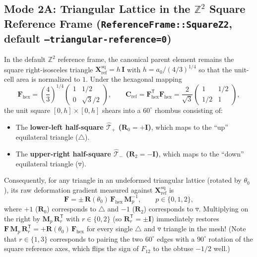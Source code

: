 \documentclass[11pt,a4paper]{article}
\newcommand{\Z}{\mathbb{Z}}
\newcommand{\T}{^{\mathsf T}}
\newcommand{\code}[1]{\texttt{#1}}
\begin{document}
\subsection{Mode 2A: Triangular Lattice in the $\Z^2$ Square Reference Frame (\code{ReferenceFrame::SquareZ2}, default \code{--triangular-reference=0})}
In the default $\Z^2$ reference frame, the canonical parent element remains the square right-isosceles triangle $\mathbf{X}_{\text{ref}}^{\text{sq}} = h\,\mathbf{I}$ with $h = a_0 / (4/3)^{1/4}$ so that the unit-cell area is normalized to $1$. Under the hexagonal mapping
\begin{equation}
  \mathbf{F}_{\text{hex}} = \left(\frac{4}{3}\right)^{1/4}
  \begin{pmatrix}
    1 & 1/2 \\
    0 & \sqrt{3}/2
  \end{pmatrix},
  \qquad
  \mathbf{C}_{\text{ref}} = \mathbf{F}_{\text{hex}}\T \mathbf{F}_{\text{hex}}
  = \frac{2}{\sqrt{3}}
  \begin{pmatrix}
    1 & 1/2 \\
    1/2 & 1
  \end{pmatrix},
\end{equation}
the unit square $[0,h]\times[0,h]$ shears into a $60^\circ$ rhombus consisting of:
\begin{itemize}[noitemsep]
  \item The \textbf{lower-left half-square $\hat{\mathcal{T}}_+$ ($\mathbf{R}_0 = +\mathbf{I}$)}, which maps to the ``up'' equilateral triangle ($\triangle$).
  \item The \textbf{upper-right half-square $\hat{\mathcal{T}}_-$ ($\mathbf{R}_2 = -\mathbf{I}$)}, which maps to the ``down'' equilateral triangle ($\triangledown$).
\end{itemize}
Consequently, for any triangle in an undeformed triangular lattice (rotated by $\theta_0$), its raw deformation gradient measured against $\mathbf{X}_{\text{ref}}^{\text{sq}}$ is
\begin{equation}
  \mathbf{F} = \pm\,\mathbf{R}(\theta_0)\,\mathbf{F}_{\text{hex}}\,\mathbf{M}_p^{-1},
  \qquad p \in \{0, 1, 2\},
\end{equation}
where $+1$ ($\mathbf{R}_0$) corresponds to $\triangle$ and $-1$ ($\mathbf{R}_2$) corresponds to $\triangledown$. Multiplying on the right by $\mathbf{M}_p\,\mathbf{R}_r\T$ with $r \in \{0, 2\}$ (so $\mathbf{R}_r\T = \pm\mathbf{I}$) immediately restores $\mathbf{F}\,\mathbf{M}_p\,\mathbf{R}_r\T = +\mathbf{R}(\theta_0)\,\mathbf{F}_{\text{hex}}$ for every single $\triangle$ and $\triangledown$ triangle in the mesh! (Note that $r \in \{1, 3\}$ corresponds to pairing the two $60^\circ$ edges with a $90^\circ$ rotation of the square reference axes, which flips the sign of $F_{12}$ to the obtuse $-1/2$ well.)
\end{document}

